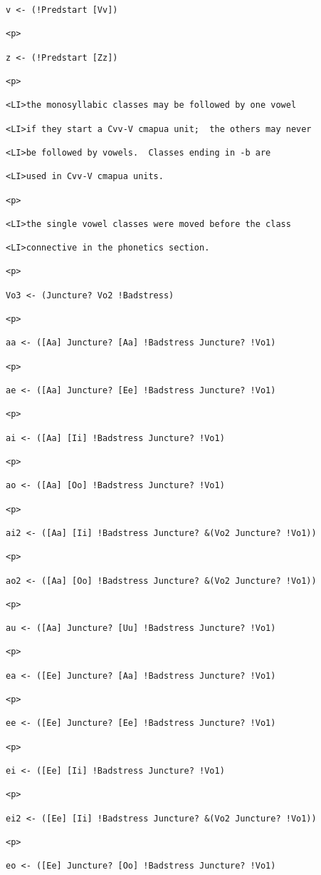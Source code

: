 \documentclass[12pt]{article}
\begin{document}
\begin{lstlisting}
v <- (!Predstart [Vv])

<p>

z <- (!Predstart [Zz])

<p>

<LI>the monosyllabic classes may be followed by one vowel

<LI>if they start a Cvv-V cmapua unit;  the others may never

<LI>be followed by vowels.  Classes ending in -b are

<LI>used in Cvv-V cmapua units.

<p>

<LI>the single vowel classes were moved before the class

<LI>connective in the phonetics section.

<p>

Vo3 <- (Juncture? Vo2 !Badstress)

<p>

aa <- ([Aa] Juncture? [Aa] !Badstress Juncture? !Vo1)

<p>

ae <- ([Aa] Juncture? [Ee] !Badstress Juncture? !Vo1)

<p>

ai <- ([Aa] [Ii] !Badstress Juncture? !Vo1)

<p>

ao <- ([Aa] [Oo] !Badstress Juncture? !Vo1)

<p>

ai2 <- ([Aa] [Ii] !Badstress Juncture? &(Vo2 Juncture? !Vo1))

<p>

ao2 <- ([Aa] [Oo] !Badstress Juncture? &(Vo2 Juncture? !Vo1))

<p>

au <- ([Aa] Juncture? [Uu] !Badstress Juncture? !Vo1)

<p>

ea <- ([Ee] Juncture? [Aa] !Badstress Juncture? !Vo1)

<p>

ee <- ([Ee] Juncture? [Ee] !Badstress Juncture? !Vo1)

<p>

ei <- ([Ee] [Ii] !Badstress Juncture? !Vo1)

<p>

ei2 <- ([Ee] [Ii] !Badstress Juncture? &(Vo2 Juncture? !Vo1))

<p>

eo <- ([Ee] Juncture? [Oo] !Badstress Juncture? !Vo1)


\end{lstlisting}
\end{document}
